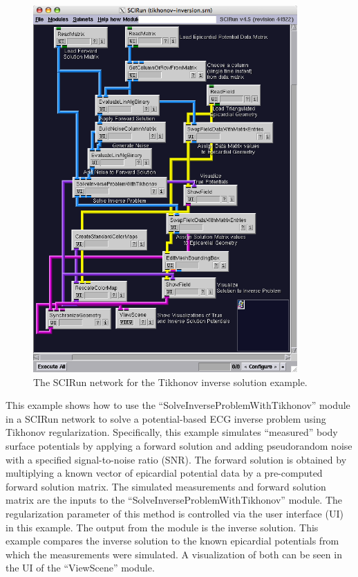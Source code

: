\begin{figure}[H]
\begin{center}
\includegraphics[width=0.9\textwidth]{ECGToolkitGuide_figures/TikhonovNetwork.png}
\caption{The SCIRun network for the Tikhonov inverse solution example.}
\label{TikhonovNetworkExample}
\end{center}
\end{figure}

This example shows how to use the ``SolveInverseProblemWithTikhonov'' module in a SCIRun network to solve a potential-based ECG inverse problem using Tikhonov regularization. Specifically, this example simulates ``measured'' body surface potentials by applying a forward solution and adding pseudorandom noise with a specified signal-to-noise ratio (SNR). The forward solution is obtained by multiplying a known vector of epicardial potential data by a pre-computed forward solution matrix. The simulated measurements and forward solution matrix are the inputs to the ``SolveInverseProblemWithTikhonov'' module. The regularization parameter of this method is controlled via the user interface (UI) in this example. The output from the module is the inverse solution. This example compares the inverse solution to the known epicardial potentials from which the measurements were simulated. A visualization of both can be seen in the UI of the ``ViewScene'' module.

